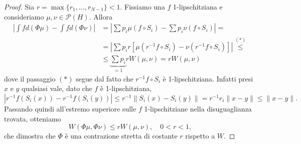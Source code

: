 \begin{proof}
	Sia $r = \max\{r_{1},\dots,r_{N-1}\} <1$. Fissiamo una $f$ 1-lipschitziana e consideriamo $\mu,\nu\in\mathcal P(H)$. Allora 
	\begin{align*}
		\left|\int f d(\Phi\mu) - \int f d(\Phi\nu)\right| &= 
		\left|\sum p_{i}\mu(f\circ S_{i}) - \sum p_{i} \nu(f\circ S_{i})\right| = \\ &=
		\left|\sum p_{i}r[\mu(r^{-1}f\circ S_{i}) - \nu(r^{-1}f\circ S_{i})]\right| \overset{(*)}{\leq} \\ &\leq
		\underbrace{\sum p_{i}}_{=1}r W(\mu,\nu) = rW(\mu,\nu) 
	\end{align*}
	dove il passaggio $(*)$ segue dal fatto che $r^{-1}f\circ S_{i}$ è 1-lipschitziana. Infatti presi $x$ e $y$ qualsiasi vale, dato che $f$ è 1-lipschitziana, 
	$$|r^{-1}f(S_{i}(x)) - r^{-1}f(S_{i}(y))|\leq r^{-1}\|S_{i}(x) - S_{i}(y)\| = r^{-1}r_{i}\|x-y\| \leq \|x-y\|.$$
	Passando quindi all'estremo superiore sulle $f$ 1-lipschitziane nella disuguaglianza trovata, otteniamo 
	$$W(\Phi\mu,\Phi\nu)\leq r W(\mu,\nu),\quad 0<r<1,$$
	che dimostra che $\Phi$ è una contrazione stretta di costante $r$ rispetto a $W$. 
	

\end{proof}
